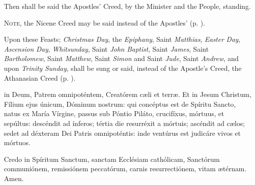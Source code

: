 \vspace{-2ex}
\begin{rubric}
    Then shall be said the Apostles' Creed, by the Minister and the People, standing.\par%
    \textsc{Note,} the Nicene Creed may be said instead of the Apostles' (p. \pageref{NiceneCreed}).
\end{rubric}
\begin{rubric}
    Upon these Feasts; \emph{Christmas Day}, the \emph{Epiphany}, Saint \emph{Matthias}, \emph{Easter Day}, \emph{Ascension Day}, \emph{Whitsunday}, Saint \emph{John Baptist}, Saint \emph{James}, Saint \emph{Bartholomew}, Saint \emph{Matthew}, Saint \emph{Simon} and Saint \emph{Jude}, Saint \emph{Andrew}, and upon \emph{Trinity Sunday}, shall be sung or said, instead of the Apostle's Creed, the Athanasian Creed (p. \pageref{Ath}).
\end{rubric}
    { in Deum, Patrem omnipoténtem, Creatórem c{\ae}li et terr{\ae}. Et in Jesum Christum, Fílium ejus únicum, Dóminum nostrum: qui concéptus est de Spíritu Sancto, natus ex María Vírgine, passus sub Póntio Piláto, crucifíxus, mórtuus, et sepúltus: descéndit ad ínferos; tértia die resurréxit a mórtuis; ascéndit ad c{\ae}los; sedet ad déxteram Dei Patris omnipoténtis: inde ventúrus est judicáre vivos et mórtuos.\par
     Credo in Spíritum Sanctum, sanctam Ecclésiam cathólicam, Sanctórum communiónem, remissiónem peccatórum, carnis {} resurrectiónem, vitam {\ae}térnam. Amen.}

